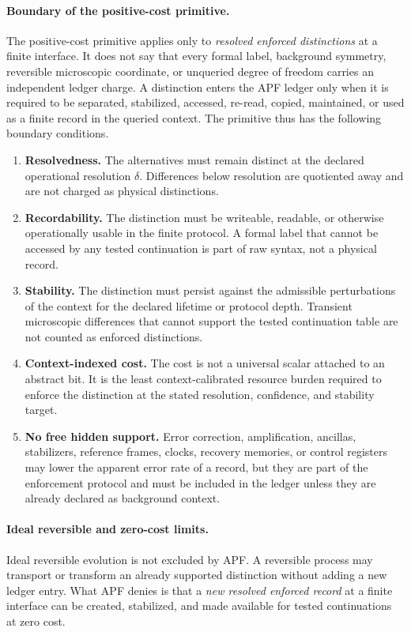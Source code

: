 \documentclass[11pt]{article}
\begin{document}
\paragraph{Boundary of the positive-cost primitive.}
The positive-cost primitive applies only to \emph{resolved enforced
distinctions} at a finite interface.  It does not say that every
formal label, background symmetry, reversible microscopic coordinate,
or unqueried degree of freedom carries an independent ledger charge.
A distinction enters the APF ledger only when it is required to be
separated, stabilized, accessed, re-read, copied, maintained, or used
as a finite record in the queried context.  The primitive thus has
the following boundary conditions.
\begin{enumerate}[label=(\roman*),leftmargin=2em]
\item \textbf{Resolvedness.}  The alternatives must remain distinct
at the declared operational resolution $\delta$.  Differences below
resolution are quotiented away and are not charged as physical
distinctions.
\item \textbf{Recordability.}  The distinction must be writeable,
readable, or otherwise operationally usable in the finite protocol.
A formal label that cannot be accessed by any tested continuation is
part of raw syntax, not a physical record.
\item \textbf{Stability.}  The distinction must persist against the
admissible perturbations of the context for the declared lifetime or
protocol depth.  Transient microscopic differences that cannot
support the tested continuation table are not counted as enforced
distinctions.
\item \textbf{Context-indexed cost.}  The cost is not a universal
scalar attached to an abstract bit.  It is the least
context-calibrated resource burden required to enforce the
distinction at the stated resolution, confidence, and stability
target.
\item \textbf{No free hidden support.}  Error correction,
amplification, ancillas, stabilizers, reference frames, clocks,
recovery memories, or control registers may lower the apparent error
rate of a record, but they are part of the enforcement protocol and
must be included in the ledger unless they are already declared as
background context.
\end{enumerate}

\paragraph{Ideal reversible and zero-cost limits.}
Ideal reversible evolution is not excluded by APF.  A reversible
process may transport or transform an already supported distinction
without adding a new ledger entry.  What APF denies is that a
\emph{new resolved enforced record} at a finite interface can be
created, stabilized, and made available for tested continuations at
zero cost.
\end{document}
